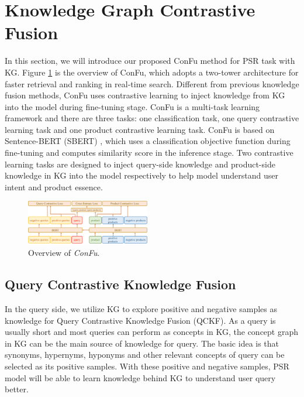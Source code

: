 \section{Knowledge Graph Contrastive Fusion}

In this section, we will introduce our proposed ConFu method for PSR task with KG. Figure \ref{kgconfu} is the overview of ConFu, which adopts a two-tower architecture for faster retrieval and ranking in real-time search. Different from previous knowledge fusion methods, ConFu uses contrastive learning to inject knowledge from KG into the model during fine-tuning stage. ConFu is a multi-task learning framework and there are three tasks: one classification task, one query contrastive learning task and one product contrastive learning task. ConFu is based on Sentence-BERT (SBERT) \cite{reimers2019sentence}, which uses a classification objective function during fine-tuning and computes similarity score in the inference stage. Two contrastive learning tasks are designed to inject query-side knowledge and product-side knowledge in KG into the model respectively to help model understand user intent and product essence. 

\begin{figure}[thbp] \centering
    \includegraphics[width=0.48\textwidth]{kgconfu_overview_4}
    \caption{Overview of \textit{ConFu}.}
    \label{kgconfu}
\end{figure}


\subsection{Query Contrastive Knowledge Fusion}
In the query side, we utilize KG to explore positive and negative samples as knowledge for Query Contrastive Knowledge Fusion (QCKF). As a query is usually short and most queries can perform as concepts in KG, the concept graph in KG can be the main source of knowledge for query. The basic idea is that synonyms, hypernyms, hyponyms and other relevant concepts of query can be selected as its positive samples.  With these positive and negative samples, PSR model will be able to learn knowledge behind KG to understand user query better.

